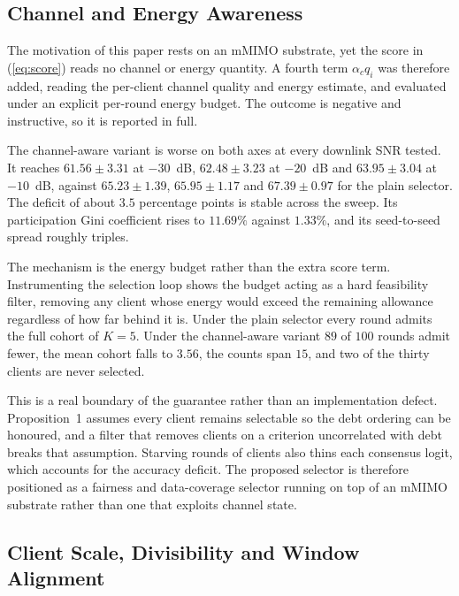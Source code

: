 \documentclass[journal]{IEEEtran}
\newcommand{\rev}[1]{#1}
\begin{document}
\subsection{Channel and Energy Awareness}
\label{ssec:exp-channel-aware}

\rev{The motivation of this paper rests on an mMIMO substrate, yet the score in (\ref{eq:score}) reads no channel or energy quantity. A fourth term $\alpha_c q_i$ was therefore added, reading the per-client channel quality and energy estimate, and evaluated under an explicit per-round energy budget. The outcome is negative and instructive, so it is reported in full.}

\rev{The channel-aware variant is worse on both axes at every downlink SNR tested. It reaches $61.56 \pm 3.31$ at $-30$~dB, $62.48 \pm 3.23$ at $-20$~dB and $63.95 \pm 3.04$ at $-10$~dB, against $65.23 \pm 1.39$, $65.95 \pm 1.17$ and $67.39 \pm 0.97$ for the plain selector. The deficit of about $3.5$ percentage points is stable across the sweep. Its participation Gini coefficient rises to $11.69\%$ against $1.33\%$, and its seed-to-seed spread roughly triples.}

\rev{The mechanism is the energy budget rather than the extra score term. Instrumenting the selection loop shows the budget acting as a hard feasibility filter, removing any client whose energy would exceed the remaining allowance regardless of how far behind it is. Under the plain selector every round admits the full cohort of $K = 5$. Under the channel-aware variant $89$ of $100$ rounds admit fewer, the mean cohort falls to $3.56$, the counts span $15$, and two of the thirty clients are never selected.}

\rev{This is a real boundary of the guarantee rather than an implementation defect. Proposition~1 assumes every client remains selectable so the debt ordering can be honoured, and a filter that removes clients on a criterion uncorrelated with debt breaks that assumption. Starving rounds of clients also thins each consensus logit, which accounts for the accuracy deficit. The proposed selector is therefore positioned as a fairness and data-coverage selector running on top of an mMIMO substrate rather than one that exploits channel state.}

\subsection{Client Scale, Divisibility and Window Alignment}
\label{ssec:exp-scale}
\end{document}
